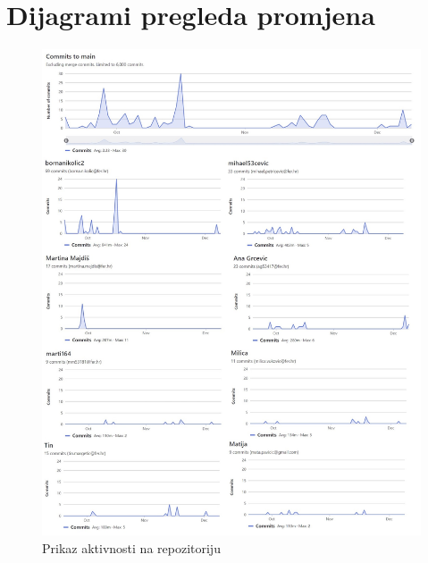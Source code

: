 		\section*{Dijagrami pregleda promjena}
		\begin{figure}[H]
			\includegraphics[scale=0.45]{dijagrami/commitovi.jpg} 
			\centering
			\caption{Prikaz aktivnosti na repozitoriju}
			\label{fig:commitovi}
		\end{figure}

		
	
